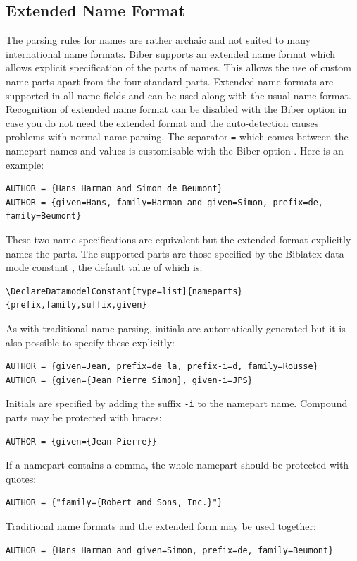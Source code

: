 \documentclass{ltxdockit}
\newcommand*{\biber}{Biber\xspace}
\newcommand*{\biblatex}{Biblatex\xspace}
\begin{document}
\subsection{Extended Name Format}
\label{biber:xname}
The parsing rules for \bibtex names are rather archaic and not suited to
many international name formats. \biber supports an extended name format
which allows explicit specification of the parts of names. This allows the
use of custom name parts apart from the four standard \bibtex parts. Extended
name formats are supported in all name fields and can be used along with
the usual \bibtex name format. Recognition of extended name format can be
disabled with the \biber option  in case you do not need the
extended format and the auto-detection causes problems with normal name
parsing. The separator \verb+=+ which comes between the namepart names and
values is customisable with the \biber option . Here is an
example:
\begin{verbatim}
AUTHOR = {Hans Harman and Simon de Beumont}
AUTHOR = {given=Hans, family=Harman and given=Simon, prefix=de, family=Beumont}
\end{verbatim}
%
These two name specifications are equivalent but the extended format
explicitly names the parts. The supported parts are those specified by the
\biblatex data mode constant , the default value of which
is:
\begin{verbatim}
\DeclareDatamodelConstant[type=list]{nameparts}{prefix,family,suffix,given}
\end{verbatim}
%
As with traditional \bibtex name parsing, initials are automatically
generated but it is also possible to specify these explicitly:
\begin{verbatim}
AUTHOR = {given=Jean, prefix=de la, prefix-i=d, family=Rousse}
AUTHOR = {given={Jean Pierre Simon}, given-i=JPS}
\end{verbatim}
%
Initials are specified by adding the suffix \verb+-i+ to the namepart name.
Compound parts may be protected with braces:
\begin{verbatim}
AUTHOR = {given={Jean Pierre}}
\end{verbatim}
%
If a namepart contains a comma, the whole namepart should be protected with
quotes:
\begin{verbatim}
AUTHOR = {"family={Robert and Sons, Inc.}"}
\end{verbatim}
%
Traditional \bibtex name formats and the extended form may be used together:
\begin{verbatim}
AUTHOR = {Hans Harman and given=Simon, prefix=de, family=Beumont}
\end{verbatim}
\end{document}
